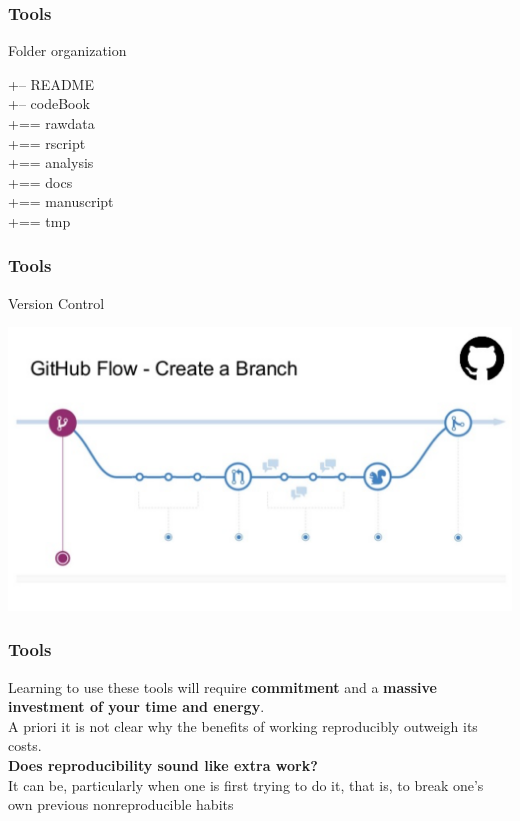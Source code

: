 \documentclass{beamer}
\begin{document}
\begin{frame}
\frametitle{Tools}
\begin{center}\Large{\sc Folder organization}\end{center}
+-- README\\
+-- codeBook\\
+== rawdata\\
+== rscript\\
+== analysis\\
+== docs\\
+== manuscript\\
+== tmp
\end{frame}

\begin{frame}
    \frametitle{Tools}
    \begin{center}\Large {\sc Version Control}\end{center}
\begin{center}\includegraphics[scale=0.45]{figures/git.png}\end{center}

\end{frame}
\begin{frame}
\frametitle{Tools}

Learning to use these tools will require \textbf{commitment} and a \textbf{massive investment of your time and energy}.\\ 
A priori it is not clear why the benefits of working reproducibly outweigh its costs.\\

{\bf Does reproducibility sound like extra work?}\\
It can be, particularly when one is first trying to do it, that is, to break one's own previous nonreproducible habits


\end{frame}
\end{document}
